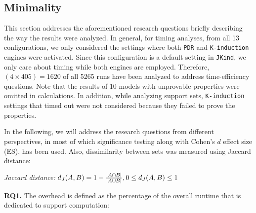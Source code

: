 \subsection{Minimality}
\label{sec:minimality}



This section addresses the aforementioned research questions briefly describing the way the results were analyzed. In general, for timing analyses, from all 13 configurations, we only considered the settings where both \texttt{PDR} and \texttt{K-induction} engines were activated. Since this configuration is a default setting in \texttt{JKind}, we only care about timing while both engines are employed. Therefore, $(4 \times 405) = 1620$ of all 5265 runs have been analyzed to address time-efficiency questions.
Note that  the results of 10 models with unprovable properties were omitted in calculations. In addition,
 while analyzing support sets, \texttt{K-induction} settings that timed out were not considered because they failed to prove the properties.

In the following, we will address the research questions from different perspectives, in most of which significance testing along with Cohen's $d$ effect size (ES), has been used. Also, dissimilarity between sets was measured using Jaccard distance:
\begin{definition}{\emph{Jaccard distance:}}
  \label{def:dj}
  $d_J(\small{A}, \small{B}) = 1 - \frac{|A \cap B|}{|A \cup B|} ,\\ 0 \leq d_J(\small{A}, \small{B}) \leq 1$
\end{definition}

\textbf{RQ1.} The overhead is defined as the percentage of the overall runtime that is dedicated to support computation:

